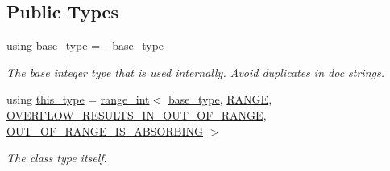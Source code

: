 \subsection*{Public Types}
\begin{DoxyCompactItemize}
\item 
\mbox{\label{classfsl_1_1ver1__0_1_1lg_1_1range__int_af14c814b65a761cd387e7577eb2ef78c}} 
using \mbox{\hyperlink{classfsl_1_1ver1__0_1_1lg_1_1range__int_af14c814b65a761cd387e7577eb2ef78c}{base\+\_\+type}} = \+\_\+base\+\_\+type
\begin{DoxyCompactList}\small\item\em The base integer type that is used internally. Avoid duplicates in doc strings. \end{DoxyCompactList}\item 
\mbox{\label{classfsl_1_1ver1__0_1_1lg_1_1range__int_a0ee4e72fddcd213f9c0440f3824544c1}} 
using \mbox{\hyperlink{classfsl_1_1ver1__0_1_1lg_1_1range__int_a0ee4e72fddcd213f9c0440f3824544c1}{this\+\_\+type}} = \mbox{\hyperlink{classfsl_1_1ver1__0_1_1lg_1_1range__int}{range\+\_\+int}}$<$ \mbox{\hyperlink{classfsl_1_1ver1__0_1_1lg_1_1range__int_af14c814b65a761cd387e7577eb2ef78c}{base\+\_\+type}}, \mbox{\hyperlink{classfsl_1_1ver1__0_1_1lg_1_1range__int_a48e6f92039600251a43bd027a8a5aa10}{R\+A\+N\+GE}}, \mbox{\hyperlink{classfsl_1_1ver1__0_1_1lg_1_1range__int_a8a6dd23271d15da337fb8af2596a9ebe}{O\+V\+E\+R\+F\+L\+O\+W\+\_\+\+R\+E\+S\+U\+L\+T\+S\+\_\+\+I\+N\+\_\+\+O\+U\+T\+\_\+\+O\+F\+\_\+\+R\+A\+N\+GE}}, \mbox{\hyperlink{classfsl_1_1ver1__0_1_1lg_1_1range__int_a4e1d255d6ab0a61338a9c75e220f9308}{O\+U\+T\+\_\+\+O\+F\+\_\+\+R\+A\+N\+G\+E\+\_\+\+I\+S\+\_\+\+A\+B\+S\+O\+R\+B\+I\+NG}} $>$
\begin{DoxyCompactList}\small\item\em The class type itself. \end{DoxyCompactList}\end{DoxyCompactItemize}
